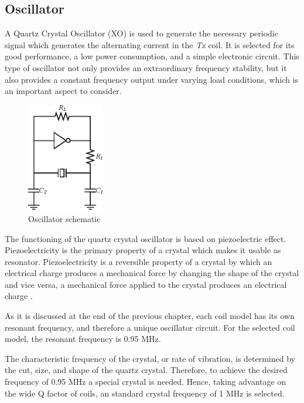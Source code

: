     \subsection{Oscillator} 
A Quartz Crystal Oscillator (XO) is used to generate the necessary periodic signal which generates the alternating current in the \textit{Tx} coil. It is selected for its good performance, a low power consumption, and a simple electronic circuit. This type of oscillator not only provides an extraordinary frequency stability, but it also provides a constant frequency output under varying load conditions, which is an important aspect to consider.

\begin{figure}[H]
\begin{center}
\includegraphics[width=0.3\textwidth]{./images/oscilador}
\caption{Oscillator schematic}
\label{F:oscillator}
\end{center}
\end{figure}

The functioning of the quartz crystal oscillator is based on piezoelectric effect. Piezoelectricity is the primary property of a crystal which makes it usable as resonator. Piezoelectricity is a reversible property of a crystal by which an electrical charge produces a mechanical force by changing the shape of the crystal and vice versa, a mechanical force applied to the crystal produces an electrical charge \cite{quartzCrystal}. 

As it is discussed at the end of the previous chapter, each coil model has its own resonant frequency, and therefore a unique oscillator circuit. For the selected coil model, the resonant frequency is 0.95 MHz. 

The characteristic frequency of the crystal, or rate of vibration, is determined by the cut, size, and shape of the quartz crystal. Therefore, to achieve the desired frequency of 0.95 MHz a special crystal is needed. Hence, taking advantage on the wide Q factor of coils, an standard crystal frequency of 1 MHz is selected. 

